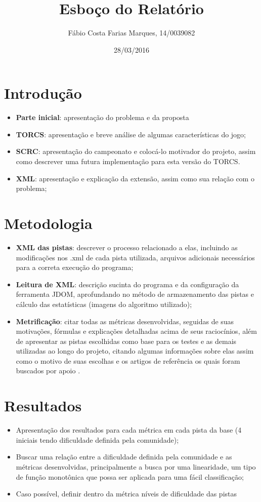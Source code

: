 \documentclass{article}
\title{Esboço do Relatório}
\author{Fábio Costa Farias Marques, 14/0039082}
\date{28/03/2016}
\begin{document}
\maketitle
\section{Introdução}
	\begin{itemize}
		\item \textbf{Parte inicial}: apresentação do problema e da proposta
		\item \textbf{TORCS}\cite{TORCS}: apresentação e breve análise de algumas características do jogo;
		\item \textbf{SCRC}: apresentação do campeonato e colocá-lo motivador do projeto, assim como descrever uma futura implementação para esta versão do TORCS.
		\item \textbf{XML}: apresentação e explicação da extensão, assim como sua relação com o problema; 
	\end{itemize}

\section{Metodologia}
	\begin{itemize}
		\item \textbf{XML das pistas}: descrever o processo relacionado a elas, incluindo as modificações nos .xml de cada pista utilizada, arquivos adicionais necessários para a correta execução do programa;
		\item \textbf{Leitura de XML}: descrição sucinta do programa e da configuração da ferramenta JDOM\cite{JDOM}, aprofundando no método de armazenamento das pistas e cálculo das estatísticas (imagens do algoritmo utilizado);
		\item \textbf{Metrificação}: citar todas as métricas desenvolvidas, seguidas de suas motivações, fórmulas e explicações detalhadas acima de seus raciocínios, além de apresentar as pistas escolhidas como base para os testes e as demais utilizadas ao longo do projeto, citando algumas informações sobre elas assim como o motivo de suas escolhas e os artigos de referência os quais foram buscados por apoio \cite{automaticgen} \cite{trackgen}.
	\end{itemize}
\section{Resultados}
	\begin{itemize}
		\item Apresentação dos resultados para cada métrica em cada pista da base (4 iniciais \cite{berniw} tendo dificuldade definida pela comunidade);
		\item Buscar uma relação entre a dificuldade definida pela comunidade e as métricas desenvolvidas, principalmente a busca por uma linearidade, um tipo de função monotônica que possa ser aplicada para uma fácil classificação;
		\item Caso possível, definir dentro da métrica níveis de dificuldade das pistas 
	\end{itemize}
\end{document}

